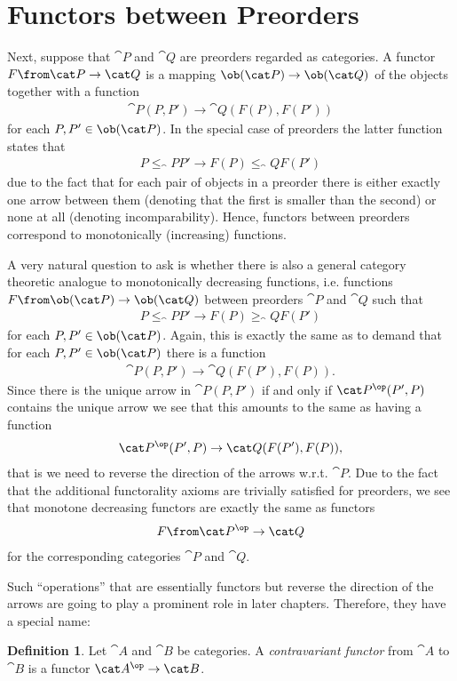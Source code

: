 \documentclass{article}
\theoremstyle{definition}
\newtheorem{definition}{Definition}
\begin{document}
\section{Functors between Preorders}
Next, suppose that $\cat P$ and $\cat Q$ are preorders regarded as categories. A functor $F\from\cat P\to\cat Q$ is a mapping $\ob(\cat P)\to\ob(\cat Q)$ of the objects together with a function
\begin{align*}
  \cat P(P,P')\to\cat Q(F(P),F(P'))
\end{align*}
for each $P,P'\in\ob(\cat P)$. In the special case of preorders the latter function states that
\begin{align*}
  P\leq_\cat P P'\rightarrow F(P)\leq_\cat Q F(P')
\end{align*}
due to the fact that for each pair of objects in a preorder there is either exactly one arrow between them (denoting that the first is smaller than the second) or none at all (denoting incomparability). Hence, functors between preorders correspond to monotonically (increasing) functions.

A very natural question to ask is whether there is also a general category theoretic analogue to monotonically decreasing functions, i.e. functions $F\from\ob(\cat P)\to\ob(\cat Q)$ between preorders $\cat P$ and $\cat Q$ such that
\begin{align*}
  P\leq_\cat P P'\rightarrow F(P)\geq_\cat Q F(P')
\end{align*}
for each $P,P'\in\ob(\cat P)$. Again, this is exactly the same as to demand that for each $P,P'\in\ob(\cat P)$ there is a function
\begin{align*}
  \cat P(P,P')\to\cat Q(F(P'),F(P)).
\end{align*}
Since there is the unique arrow in $\cat P(P,P')$ if and only if $\cat P^\op(P',P)$ contains the unique arrow we see that this amounts to the same as having a function
\begin{align*}
  \cat P^\op(P',P)\to\cat Q(F(P'),F(P)),
\end{align*}
that is we need to reverse the direction of the arrows w.r.t. $\cat P$. Due to the fact that the additional functorality axioms are trivially satisfied for preorders, we see that monotone decreasing functors are exactly the same as functors
\begin{align*}
  F\from\cat P^\op\to\cat Q
\end{align*}
for the corresponding categories $\cat P$ and $\cat Q$.

Such ``operations'' that are essentially functors but reverse the direction of the arrows are going to play a prominent role in later chapters. Therefore, they have a special name:
\begin{definition}
  Let $\cat A$ and $\cat B$ be categories. A \emph{contravariant functor} from $\cat A$ to $\cat B$ is a functor $\cat A^\op\to\cat B$.
\end{definition}
\end{document}
